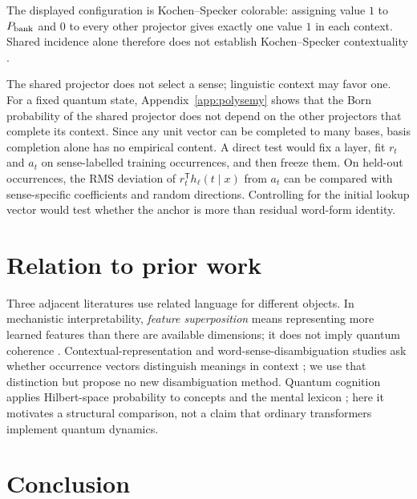 \documentclass[
  aps,
  reprint,
  superscriptaddress,
  floatfix,
  nofootinbib,
  longbibliography
]{revtex4-2}
\newcommand{\T}{^{\mathsf T}}
\begin{document}
The displayed configuration is Kochen--Specker colorable: assigning value
$1$ to $P_{\rm bank}$ and $0$ to every other projector gives exactly one value
$1$ in each context.  Shared incidence alone therefore does not establish
Kochen--Specker contextuality \cite{specker-60,kochen1}.

The shared projector does not select a sense; linguistic context may favor
one.  For a fixed quantum state, Appendix~\ref{app:polysemy} shows that the
Born probability of the shared projector does not depend on the other
projectors that complete its context.  Since any unit vector can be completed
to many bases, basis completion alone has no empirical content.  A direct test
would fix a layer, fit $r_t$ and $a_t$ on sense-labelled training occurrences,
and then freeze them.  On held-out occurrences, the RMS deviation of
$r_t\T h_\ell(t\mid x)$ from $a_t$ can be compared with sense-specific
coefficients and random directions.  Controlling for the initial lookup vector
would test whether the anchor is more than residual word-form identity.

\section{Relation to prior work}
\label{sec:prior-work}

Three adjacent literatures use related language for different objects.  In
mechanistic interpretability, \emph{feature superposition} means representing
more learned features than there are available dimensions; it does not imply
quantum coherence \cite{elhage2022superposition}.  Contextual-representation
and word-sense-disambiguation studies ask whether occurrence vectors
distinguish meanings in context
\cite{ethayarajh2019,pilehvar2019wic,wiedemann2019does,scarlini2020ares}; we
use that distinction but propose no new disambiguation method.  Quantum
cognition applies Hilbert-space probability to concepts and the mental lexicon
\cite{bruza2009lexicon,Busemeyer2012}; here it motivates a structural
comparison, not a claim that ordinary transformers implement quantum dynamics.

\section{Conclusion}
\label{sec:conclusion}
\end{document}
